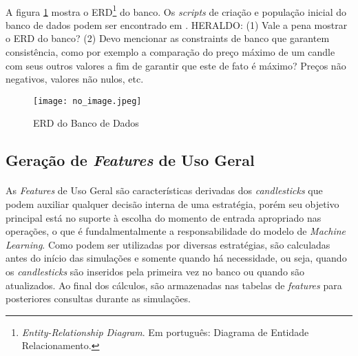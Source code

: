 
\paragraph{} A figura \ref{fig:103} mostra o ERD\footnote{\textit{Entity-Relationship Diagram}. Em português: Diagrama de Entidade Relacionamento.} do banco. Os \textit{scripts} de criação e população inicial do banco de dados podem ser encontrado em \cite{github_projeto}. \color{red} HERALDO: (1) Vale a pena mostrar o ERD do banco? (2) Devo mencionar as constraints de banco que garantem consistência, como por exemplo a comparação do preço máximo de um candle com seus outros valores a fim de garantir que este de fato é máximo? Preços não negativos, valores não nulos, etc. 

\begin{figure}[!htb]
    \texttt{[image: no\_image.jpeg]}
    \centering
    \caption{ERD do Banco de Dados}
    \label{fig:103}
\end{figure}



\FloatBarrier
\subsection{Geração de \textit{Features} de Uso Geral}
\label{sub:features}

\paragraph{} As \textit{Features} de Uso Geral são características derivadas dos \textit{candlesticks} que podem auxiliar qualquer decisão interna de uma estratégia, porém seu objetivo principal está no suporte à escolha do momento de entrada apropriado nas operações, o que é fundalmentalmente a responsabilidade do modelo de \textit{Machine Learning}. Como podem ser utilizadas por diversas estratégias, são calculadas antes do início das simulações e somente quando há necessidade, ou seja, quando os \textit{candlesticks} são inseridos pela primeira vez no banco ou quando são atualizados. Ao final dos cálculos, são armazenadas nas tabelas de \textit{features} para posteriores consultas durante as simulações.

